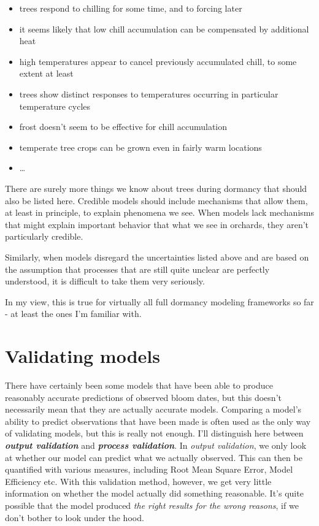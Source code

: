 \documentclass[
]{book}
\providecommand{\tightlist}{%
  \setlength{\itemsep}{0pt}\setlength{\parskip}{0pt}}
\begin{document}
\begin{itemize}
\tightlist
\item
  trees respond to chilling for some time, and to forcing later
\item
  it seems likely that low chill accumulation can be compensated by additional heat
\item
  high temperatures appear to cancel previously accumulated chill, to some extent at least
\item
  trees show distinct responses to temperatures occurring in particular temperature cycles
\item
  frost doesn't seem to be effective for chill accumulation
\item
  temperate tree crops can be grown even in fairly warm locations
\item
  \ldots{}
\end{itemize}

There are surely more things we know about trees during dormancy that should also be listed here. Credible models should include mechanisms that allow them, at least in principle, to explain phenomena we see. When models lack mechanisms that might explain important behavior that what we see in orchards, they aren't particularly credible.

Similarly, when models disregard the uncertainties listed above and are based on the assumption that processes that are still quite unclear are perfectly understood, it is difficult to take them very seriously.

In my view, this is true for virtually all full dormancy modeling frameworks so far - at least the ones I'm familiar with.

\hypertarget{validating-models}{%
\section{Validating models}\label{validating-models}}

There have certainly been some models that have been able to produce reasonably accurate predictions of observed bloom dates, but this doesn't necessarily mean that they are actually accurate models. Comparing a model's ability to predict observations that have been made is often used as the only way of validating models, but this is really not enough. I'll distinguish here between \textbf{\emph{output validation}} and \textbf{\emph{process validation}}. In \emph{output validation}, we only look at whether our model can predict what we actually observed. This can then be quantified with various measures, including Root Mean Square Error, Model Efficiency etc. With this validation method, however, we get very little information on whether the model actually did something reasonable. It's quite possible that the model produced \emph{the right results for the wrong reasons}, if we don't bother to look under the hood.
\end{document}
